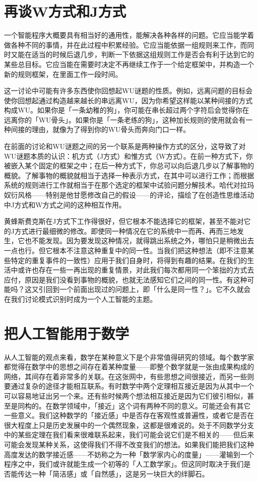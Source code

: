 \documentclass[
  12pt,
  twoside,
  openright,
  oldfontcommands,
]{memoir}
\begin{document}
\section{再谈W方式和J方式}

一个智能程序大概要具有相当好的通用性，能解决各种各样的问题。它应当能学着做各种不同的事情，并在此过程中积累经验。它应当能依据一组规则来工作，而同时又能在适当的时候后退几步，判断一下依据这组规则工作是否会有利于达到它的某些总目标。它应当能在需要时决定不再继续工作于一个给定框架中，并构造一个新的规则框架，在里面工作一段时间。

这一讨论中可能有许多东西使你回想起WU谜题的性质。例如，远离问题的目标会使你回想起通过构造越来越长的串远离WU，因为你希望这样能以某种间接的方式构成WU。如果你是「一条幼稚的狗」，你可能在串长超过两个字符后会觉得你在远离你的「WU骨头」。如果你是「一条老练的狗」，这种加长规则的使用就会有一种间接的理由，就像为了得到你的WU骨头而奔向门口一样。

在前面的讨论和WU谜题之间的另一个联系是两种操作方式的区分，这导致了对WU谜题本质的认识：机方式（J方式）和惟方式（W方式）。在前一种方式下，你被嵌入某个固定的框架之中；在后一种方式下，你总可以向后退几步以了解事物的概貌。了解事物的概貌就相当于选择一种表示方式，在其中可以进行工作；而根据系统的规则进行工作就相当于在那个选定的框架中试验问题分解技术。哈代对拉玛奴衍风格------特别是他甘愿修改自己的假设------的评论，描绘了在创造性思维活动中J方式和W方式之间的这种相互作用。

黄蜂斯费克斯在J方式下工作得很好，但它根本不能选择它的框架，甚至不能对它的J方式进行最细微的修改。即使同一种情况在它的系统中一而再、再而三地发生，它也不能发现。因为要发现这种情况，就得跳出系统之外，哪怕只是稍微出去一点也行。但它根本不注意这种重复中的同一性。当我们把这种想法（即不注意某些特定的重复事件的一致性）应用于我们自身时，将得到有趣的结果。在我们的生活中或许也存在一些一再出现的重复情景，对此我们每次都用同一个笨拙的方式去应付，原因是我们没看到事物的概貌，也就无法感知它们之间的同一性。有这种可能吗？这又引回到一个前面出现过的问题上，即「什么是同一性？」。它不久就会在我们讨论模式识别时成为一个人工智能的主题。

\section{把人工智能用于数学}

从人工智能的观点来看，数学在某种意义下是个非常值得研究的领域。每个数学家都觉得在数学中的思想之间存在着某种度量------即整个数学就是一张由成果构成的网络，其间存在着非常多的关联。在这张网中，有些思想之间很接近，而另一些则要通过复杂的途径才能相互联系。有时数学中两个定理相互接近是因为从其中一个可以容易地证出另一个来。还有些时候两个想法相互接近是因为它们彼引相似，甚至是同构的。在数学领域中，「接近」这个词有两种不同的意义。可能还会有其它一些意义。我们这种数学的「接近感」中是否存在客观性或普遍性，或者它是否在很大程度上只是历史发展中的一个偶然现象，这都是很难说的。处于不同数学分支中的某些定理在我们看来很难联系起来，我们可能会说它们是不相关的------但后来可能会发现某种关系，这使得我们不得不改变我们的想法。如果我们能把我们这种高度发达的数学接近感------不妨称之为一种「数学家内心的度量」------灌输到一个程序之中，我们或许就能生成一个初等的「人工数学家」。但这同时取决于我们是否能传达一种「简洁感」或「自然感」，这是另一块巨大的绊脚石。
\end{document}
